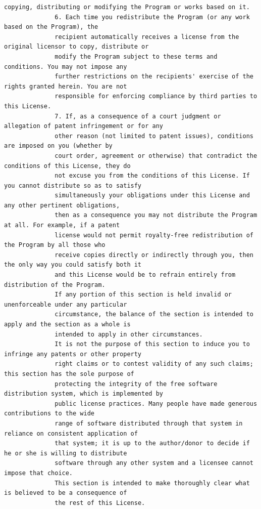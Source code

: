\begin{lstlisting}[basicstyle=\ttfamily\scriptsize,breaklines=true]
              copying, distributing or modifying the Program or works based on it.
              6. Each time you redistribute the Program (or any work based on the Program), the
              recipient automatically receives a license from the original licensor to copy, distribute or
              modify the Program subject to these terms and conditions. You may not impose any
              further restrictions on the recipients' exercise of the rights granted herein. You are not
              responsible for enforcing compliance by third parties to this License.
              7. If, as a consequence of a court judgment or allegation of patent infringement or for any
              other reason (not limited to patent issues), conditions are imposed on you (whether by
              court order, agreement or otherwise) that contradict the conditions of this License, they do
              not excuse you from the conditions of this License. If you cannot distribute so as to satisfy
              simultaneously your obligations under this License and any other pertinent obligations,
              then as a consequence you may not distribute the Program at all. For example, if a patent
              license would not permit royalty-free redistribution of the Program by all those who
              receive copies directly or indirectly through you, then the only way you could satisfy both it
              and this License would be to refrain entirely from distribution of the Program.
              If any portion of this section is held invalid or unenforceable under any particular
              circumstance, the balance of the section is intended to apply and the section as a whole is
              intended to apply in other circumstances.
              It is not the purpose of this section to induce you to infringe any patents or other property
              right claims or to contest validity of any such claims; this section has the sole purpose of
              protecting the integrity of the free software distribution system, which is implemented by
              public license practices. Many people have made generous contributions to the wide
              range of software distributed through that system in reliance on consistent application of
              that system; it is up to the author/donor to decide if he or she is willing to distribute
              software through any other system and a licensee cannot impose that choice.
              This section is intended to make thoroughly clear what is believed to be a consequence of
              the rest of this License.

\end{lstlisting}
